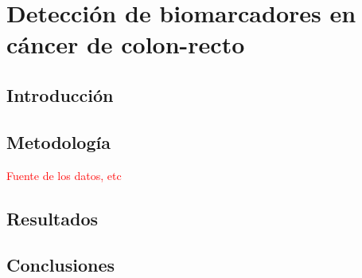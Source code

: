 \chapter{Detección de biomarcadores en cáncer de colon-recto}

\section{Introducción}

\section{Metodología}

\textcolor{red}{Fuente de los datos, etc}

\section{Resultados}


\section{Conclusiones}

